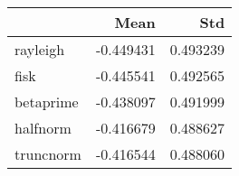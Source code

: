 \begin{tabular}{lrr}
\toprule
{} &      Mean &       Std \\
\midrule
rayleigh  & -0.449431 &  0.493239 \\
fisk      & -0.445541 &  0.492565 \\
betaprime & -0.438097 &  0.491999 \\
halfnorm  & -0.416679 &  0.488627 \\
truncnorm & -0.416544 &  0.488060 \\
\bottomrule
\end{tabular}
